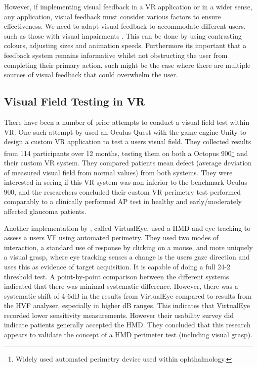 \documentclass{l4proj}
\begin{document}
However, if implementing visual feedback in a VR application or in a wider sense, any application, visual feedback must consider various factors to ensure effectiveness. We need to adapt visual feedback to accommodate different users, such as those with visual impairments \citep{HCIMotionDesign2023}. This can be done by using contrasting colours, adjusting sizes and animation speeds. Furthermore its important that a feedback system remains informative whilst not obstructing the user from completing their primary action, such might be the case where there are multiple sources of visual feedback that could overwhelm the user.


\subsection{Visual Field Testing in VR}
There have been a number of prior attempts to conduct a visual field test within VR. One such attempt by \citet{Stapelfeldt2021VRGlaucoma} used an Oculus Quest with the game engine Unity to design a custom VR application to test a users visual field. They collected results from 114 participants over 12 months, testing them on both a Octopus 900\footnote{Widely used automated perimetry device used within ophthalmology.} and their custom VR system. They compared patients mean defect (average deviation of measured visual field from normal values) from both systems. They were interested in seeing if this VR system was non-inferior to the benchmark Oculus 900, and the researchers concluded their custom VR perimetry test performed comparably to a clinically performed AP test in healthy and early/moderately affected glaucoma patients.

Another implementation by \citet{Wroblewski2014TestingVisualField}, called VirtualEye, used a HMD and eye tracking to assess a users VF using automated perimetry. They used two modes of interaction, a standard use of response by clicking on a mouse, and more uniquely a visual grasp, where eye tracking senses a change is the users gaze direction and uses this as evidence of target acquisition. It is capable of doing a full 24-2 threshold test. A point-by-point comparison between the different systems indicated that there was minimal systematic difference. However, there was a systematic shift of 4-6dB in the results from VirtualEye compared to results from the HVF analyser, especially in higher dB ranges. This indicates that VirtualEye recorded lower sensitivity measurements. However their usability survey did indicate patients generally accepted the HMD. They concluded that this research appears to validate the concept of a HMD perimeter test (including visual grasp).
\end{document}
